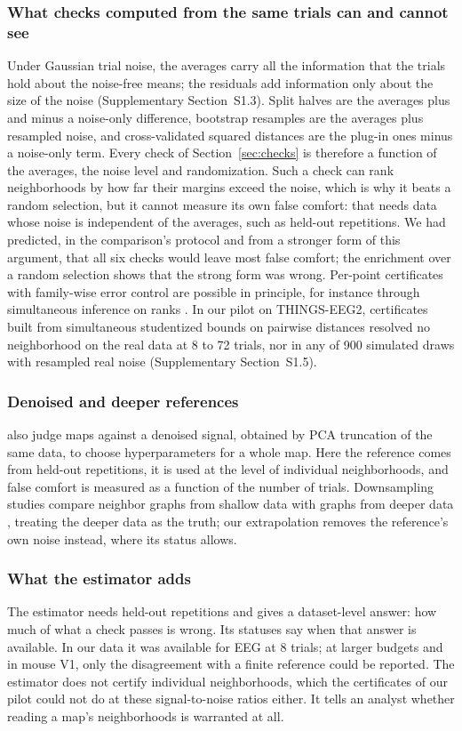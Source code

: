 \documentclass[11pt]{article}
\newcommand{\CertDraws}{900}
\begin{document}
\subsubsection{What checks computed from the same trials can and cannot see}
Under Gaussian trial noise, the averages carry all the information that the trials hold about the noise-free means; the residuals add information only about the size of the noise (Supplementary Section~S1.3).
Split halves are the averages plus and minus a noise-only difference, bootstrap resamples are the averages plus resampled noise, and cross-validated squared distances are the plug-in ones minus a noise-only term.
Every check of Section~\ref{sec:checks} is therefore a function of the averages, the noise level and randomization.
Such a check can rank neighborhoods by how far their margins exceed the noise, which is why it beats a random selection, but it cannot measure its own false comfort: that needs data whose noise is independent of the averages, such as held-out repetitions.
We had predicted, in the comparison's protocol and from a stronger form of this argument, that all six checks would leave most false comfort; the enrichment over a random selection shows that the strong form was wrong.
Per-point certificates with family-wise error control are possible in principle, for instance through simultaneous inference on ranks \citep{mogstad2024}.
In our pilot on THINGS-EEG2, certificates built from simultaneous studentized bounds on pairwise distances resolved no neighborhood on the real data at 8 to 72 trials, nor in any of \CertDraws{} simulated draws with resampled real noise (Supplementary Section~S1.5).

\subsubsection{Denoised and deeper references}
\citet{lin2024} also judge maps against a denoised signal, obtained by PCA truncation of the same data, to choose hyperparameters for a whole map.
Here the reference comes from held-out repetitions, it is used at the level of individual neighborhoods, and false comfort is measured as a function of the number of trials.
Downsampling studies compare neighbor graphs from shallow data with graphs from deeper data \citep{ahlmann2023}, treating the deeper data as the truth; our extrapolation removes the reference's own noise instead, where its status allows.

\subsubsection{What the estimator adds}
The estimator needs held-out repetitions and gives a dataset-level answer: how much of what a check passes is wrong.
Its statuses say when that answer is available.
In our data it was available for EEG at 8 trials; at larger budgets and in mouse V1, only the disagreement with a finite reference could be reported.
The estimator does not certify individual neighborhoods, which the certificates of our pilot could not do at these signal-to-noise ratios either.
It tells an analyst whether reading a map's neighborhoods is warranted at all.
\end{document}
